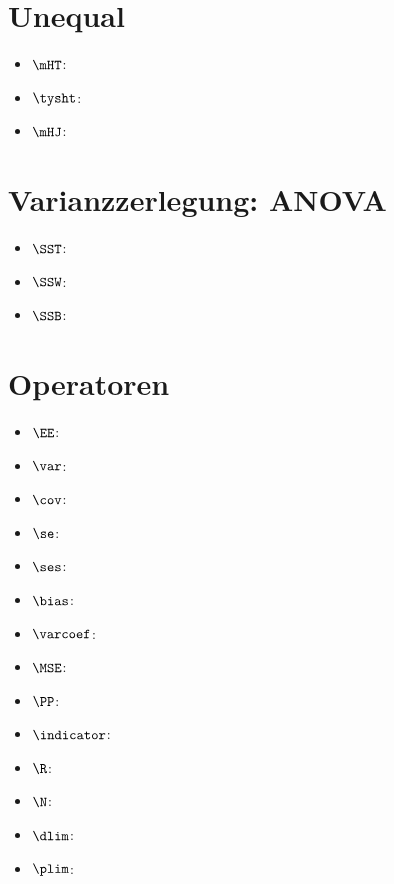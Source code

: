 \section{Unequal}
\begin{itemize}
    \item $\mHT$: 
    \item $\tysht$: 
    \item $\mHJ$: 
\end{itemize}

\section{Varianzzerlegung: ANOVA}
\begin{itemize}
    \item $\SST$: 
    \item $\SSW$: 
    \item $\SSB$: 
\end{itemize}

\section{Operatoren}
\begin{itemize}
    \item $\EE$: 
    \item $\var$: 
    \item $\cov$: 
    \item $\se$: 
    \item $\ses$: 
    \item $\bias$: 
    \item $\varcoef$: 
    \item $\MSE$: 
    \item $\PP$: 
    \item $\indicator$: 
    \item $\R$: 
    \item $\N$: 
    \item $\dlim$: 
    \item $\plim$: 
\end{itemize}



